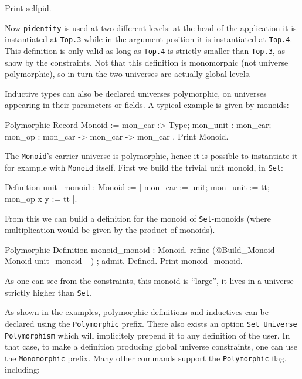 \begin{coq_example}
Print selfpid.
\end{coq_example}

Now \texttt{pidentity} is used at two different levels: at the head of
the application it is instantiated at \texttt{Top.3} while in the
argument position it is instantiated at \texttt{Top.4}. This definition
is only valid as long as \texttt{Top.4} is strictly smaller than
\texttt{Top.3}, as show by the constraints. Not that this definition is
monomorphic (not universe polymorphic), so in turn the two universes are
actually global levels.

Inductive types can also be declared universes polymorphic, on universes
appearing in their parameters or fields. A typical example is given by
monoids:

\begin{coq_example}
Polymorphic Record Monoid := { mon_car :> Type; mon_unit : mon_car; 
  mon_op : mon_car -> mon_car -> mon_car }.
Print Monoid.
\end{coq_example}

The \texttt{Monoid}'s carrier universe is polymorphic, hence it is
possible to instantiate it for example with \texttt{Monoid} itself.
First we build the trivial unit monoid, in \texttt{Set}:
\begin{coq_example}
Definition unit_monoid : Monoid := 
  {| mon_car := unit; mon_unit := tt; mon_op x y := tt |}.
\end{coq_example} 

From this we can build a definition for the monoid of
\texttt{Set}-monoids (where multiplication would be given by the product
of monoids).

\begin{coq_example}
Polymorphic Definition monoid_monoid : Monoid.
  refine (@Build_Monoid Monoid unit_monoid _) ; admit.
Defined.
Print monoid_monoid.
\end{coq_example} 

As one can see from the constraints, this monoid is ``large'', it lives
in a universe strictly higher than \texttt{Set}.


As shown in the examples, polymorphic definitions and inductives can be
declared using the \texttt{Polymorphic} prefix. There also exists an
option \texttt{Set Universe Polymorphism} which will implicitely prepend
it to any definition of the user. In that case, to make a definition
producing global universe constraints, one can use the
\texttt{Monomorphic} prefix. Many other commands support the
\texttt{Polymorphic} flag, including:

